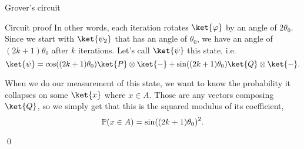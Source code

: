 \documentclass[a4paper]{article}
\begin{document}
\begin{parag}{Grover's circuit}
\begin{subparag}{Circuit proof}
        In other words, each iteration rotates $\ket{\phi}$ by an angle of $2 \theta_0$. Since we start with $\ket{\psi_2}$ that has an angle of $\theta_0$, we have an angle of $\left(2k + 1\right)\theta_0$ after $k$ iterations. Let's call $\ket{\psi}$ this state, i.e. 
        \[\ket{\psi} = \cos\left(\left(2k + 1\right) \theta_0\right) \ket{P} \otimes \ket{-} + \sin\left(\left(2k+1\right) \theta_0\right)\ket{Q} \otimes \ket{-}.\]

        When we do our measurement of this state, we want to know the probability it collapses on some $\ket{x}$ where $x \in A$. Those are any vectors composing $\ket{Q}$, so we simply get that this is the squared modulus of its coefficient,
        \[\prob\left(x \in A\right) = \sin\left(\left(2k + 1\right) \theta_0\right)^2.\]

        \qed
    \end{subparag}
\end{parag}
\end{document}
